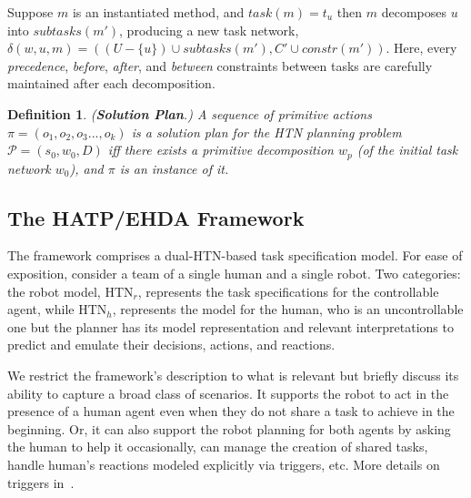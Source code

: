 \documentclass[letterpaper]{article} %
\newtheorem{definition}{Definition}
\begin{document}
Suppose $m$ is an instantiated method, and $task(m)=t_u$ then $m$ decomposes $u$ into $subtasks(m')$, producing a new task network, $\delta(w,u,m)=((U-\{u\})\cup subtasks(m'),C'\cup constr(m'))$.
Here, every \textit{precedence}, \textit{before}, \textit{after}, and \textit{between} constraints between tasks are carefully maintained after each decomposition.

\begin{definition} 
(\textbf{Solution Plan}.) 
{A sequence of primitive actions $\pi=(o_1,o_2,o_3...,o_k)$ is a solution plan for the HTN planning problem $\mathcal{P}=(s_0,w_0,D)$ iff there exists a primitive decomposition $w_p$ (of the initial task network $w_0$), and $\pi$ is an instance of it. 
}  
\label{def:htn-sol-plan}
\end{definition}

\subsection{The HATP/EHDA Framework}
The framework comprises a dual-HTN-based task specification model.   
For ease of exposition, consider a team of a single human and a single robot. Two categories: the robot model, $\mathrm{HTN}_{r}$, represents the task specifications for the  controllable agent, while $\mathrm{HTN}_{h}$, represents the model for the human, who is an uncontrollable one but the planner has its model
representation and relevant interpretations to predict and emulate their decisions, actions, and reactions. 


We restrict the framework's description to what is relevant but briefly discuss its ability to capture a broad class of scenarios. It supports the robot to act in the presence of a human agent even when they do not share a task to achieve in the beginning. Or, it can also support the robot planning for both agents by asking the human to help it occasionally, can manage the creation of shared tasks, handle human's reactions modeled explicitly via triggers, etc. More details on triggers  in~\cite{ingrand1996prs,AlamiCFGI98}.   
\end{document}
